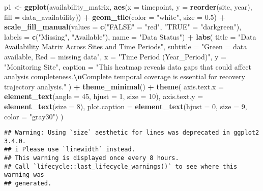\documentclass[
]{article}
\newenvironment{Shaded}{\begin{snugshade}}{\end{snugshade}}
\newcommand{\AttributeTok}[1]{\textcolor[rgb]{0.13,0.29,0.53}{#1}}
\newcommand{\DecValTok}[1]{\textcolor[rgb]{0.00,0.00,0.81}{#1}}
\newcommand{\FloatTok}[1]{\textcolor[rgb]{0.00,0.00,0.81}{#1}}
\newcommand{\FunctionTok}[1]{\textcolor[rgb]{0.13,0.29,0.53}{\textbf{#1}}}
\newcommand{\NormalTok}[1]{#1}
\newcommand{\OtherTok}[1]{\textcolor[rgb]{0.56,0.35,0.01}{#1}}
\newcommand{\SpecialCharTok}[1]{\textcolor[rgb]{0.81,0.36,0.00}{\textbf{#1}}}
\newcommand{\StringTok}[1]{\textcolor[rgb]{0.31,0.60,0.02}{#1}}
\begin{document}
\begin{Shaded}
\begin{Highlighting}[]
\NormalTok{p1 }\OtherTok{\textless{}{-}} \FunctionTok{ggplot}\NormalTok{(availability\_matrix, }\FunctionTok{aes}\NormalTok{(}\AttributeTok{x =}\NormalTok{ timepoint, }\AttributeTok{y =} \FunctionTok{reorder}\NormalTok{(site, year), }\AttributeTok{fill =}\NormalTok{ data\_availability)) }\SpecialCharTok{+}
  \FunctionTok{geom\_tile}\NormalTok{(}\AttributeTok{color =} \StringTok{"white"}\NormalTok{, }\AttributeTok{size =} \FloatTok{0.5}\NormalTok{) }\SpecialCharTok{+}
  \FunctionTok{scale\_fill\_manual}\NormalTok{(}\AttributeTok{values =} \FunctionTok{c}\NormalTok{(}\StringTok{"FALSE"} \OtherTok{=} \StringTok{"red"}\NormalTok{, }\StringTok{"TRUE"} \OtherTok{=} \StringTok{"darkgreen"}\NormalTok{), }
                    \AttributeTok{labels =} \FunctionTok{c}\NormalTok{(}\StringTok{"Missing"}\NormalTok{, }\StringTok{"Available"}\NormalTok{),}
                    \AttributeTok{name =} \StringTok{"Data Status"}\NormalTok{) }\SpecialCharTok{+}
  \FunctionTok{labs}\NormalTok{(}
    \AttributeTok{title =} \StringTok{"Data Availability Matrix Across Sites and Time Periods"}\NormalTok{,}
    \AttributeTok{subtitle =} \StringTok{"Green = data available, Red = missing data"}\NormalTok{,}
    \AttributeTok{x =} \StringTok{"Time Period (Year\_Period)"}\NormalTok{,}
    \AttributeTok{y =} \StringTok{"Monitoring Site"}\NormalTok{,}
    \AttributeTok{caption =} \StringTok{"This heatmap reveals data gaps that could affect analysis completeness.}\SpecialCharTok{\textbackslash{}n}\StringTok{Complete temporal coverage is essential for recovery trajectory analysis."}
\NormalTok{  ) }\SpecialCharTok{+}
  \FunctionTok{theme\_minimal}\NormalTok{() }\SpecialCharTok{+}
  \FunctionTok{theme}\NormalTok{(}
    \AttributeTok{axis.text.x =} \FunctionTok{element\_text}\NormalTok{(}\AttributeTok{angle =} \DecValTok{45}\NormalTok{, }\AttributeTok{hjust =} \DecValTok{1}\NormalTok{, }\AttributeTok{size =} \DecValTok{10}\NormalTok{),}
    \AttributeTok{axis.text.y =} \FunctionTok{element\_text}\NormalTok{(}\AttributeTok{size =} \DecValTok{8}\NormalTok{),}
    \AttributeTok{plot.caption =} \FunctionTok{element\_text}\NormalTok{(}\AttributeTok{hjust =} \DecValTok{0}\NormalTok{, }\AttributeTok{size =} \DecValTok{9}\NormalTok{, }\AttributeTok{color =} \StringTok{"gray30"}\NormalTok{)}
\NormalTok{  )}
\end{Highlighting}
\end{Shaded}

\begin{verbatim}
## Warning: Using `size` aesthetic for lines was deprecated in ggplot2 3.4.0.
## i Please use `linewidth` instead.
## This warning is displayed once every 8 hours.
## Call `lifecycle::last_lifecycle_warnings()` to see where this warning was
## generated.
\end{verbatim}
\end{document}

